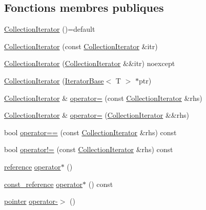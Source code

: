 \subsection*{Fonctions membres publiques}
\begin{DoxyCompactItemize}
\item 
\hyperlink{class_collection_iterator_ad43d61217203dfc7639ff9cc215cbbb5}{Collection\+Iterator} ()=default
\item 
\hyperlink{class_collection_iterator_a9db87c21c0786441895f008bc3508785}{Collection\+Iterator} (const \hyperlink{class_collection_iterator}{Collection\+Iterator} \&itr)
\item 
\hyperlink{class_collection_iterator_a0507f147322bb135486239871259fce6}{Collection\+Iterator} (\hyperlink{class_collection_iterator}{Collection\+Iterator} \&\&itr) noexcept
\item 
\hyperlink{class_collection_iterator_a538532a008fd442918b5f2f73e9bd2d2}{Collection\+Iterator} (\hyperlink{class_iterator_base}{Iterator\+Base}$<$ T $>$ $\ast$ptr)
\item 
\hyperlink{class_collection_iterator}{Collection\+Iterator} \& \hyperlink{class_collection_iterator_a2a03298e6ea06b1e6344cf4be9e1439e}{operator=} (const \hyperlink{class_collection_iterator}{Collection\+Iterator} \&rhs)
\item 
\hyperlink{class_collection_iterator}{Collection\+Iterator} \& \hyperlink{class_collection_iterator_a0833a1abf480292154ba6e9f838b431b}{operator=} (\hyperlink{class_collection_iterator}{Collection\+Iterator} \&\&rhs)
\item 
bool \hyperlink{class_collection_iterator_ab0bd97b5ce32b24ea6559370805cf8ee}{operator==} (const \hyperlink{class_collection_iterator}{Collection\+Iterator} \&rhs) const
\item 
bool \hyperlink{class_collection_iterator_a97f25f4b7c4f5ad3364c79224d31c666}{operator!=} (const \hyperlink{class_collection_iterator}{Collection\+Iterator} \&rhs) const
\item 
\hyperlink{class_collection_iterator_aac15417aa7a67fdfb86b8bad1b4d5ddf}{reference} \hyperlink{class_collection_iterator_a33e98fda7a97c6105562074ca52d9a36}{operator$\ast$} ()
\item 
\hyperlink{class_collection_iterator_ab0f0742da5375882a74038d82de41aca}{const\+\_\+reference} \hyperlink{class_collection_iterator_ad8f71e444278158b6f290d723a3639ac}{operator$\ast$} () const
\item 
\hyperlink{class_collection_iterator_aff846a9c86022d66a7eb10e3623a0ba0}{pointer} \hyperlink{class_collection_iterator_a633510976e0de7df1a1f2d55ec289237}{operator-\/$>$} ()

\end{DoxyCompactItemize}
